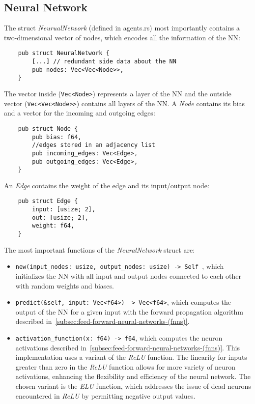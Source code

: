 \subsection{Neural Network}\label{subsec:neural-network}
The struct \textit{NeurualNetwork} (defined in agents.rs) most importantly contains a two-dimensional vector of nodes, which encodes all the information of the NN\@:
\begin{verbatim}
    pub struct NeuralNetwork {
        [...] // redundant side data about the NN
        pub nodes: Vec<Vec<Node>>,
    }
\end{verbatim}
The vector inside (\texttt{Vec<Node>}) represents a layer of the NN and the outside vector (\texttt{Vec<Vec<Node>>}) contains all layers of the NN\@.
A \textit{Node} contains its bias and a vector for the incoming and outgoing edges:
\begin{verbatim}
    pub struct Node {
        pub bias: f64,
        //edges stored in an adjacency list
        pub incoming_edges: Vec<Edge>,
        pub outgoing_edges: Vec<Edge>,
    }
\end{verbatim}
An \textit{Edge} contains the weight of the edge and its input/output node:
\begin{verbatim}
    pub struct Edge {
        input: [usize; 2],
        out: [usize; 2],
        weight: f64,
    }
\end{verbatim}
The most important functions of the \textit{NeuralNetwork} struct are:
\begin{itemize}
    \item \texttt{new(input_nodes: usize, output_nodes: usize) -> Self {}}, which initializes the NN with all input and output nodes connected to each other with random weights and biases.
    \item \texttt{predict(&self, input: Vec<f64>) -> Vec<f64>}, which computes the output of the NN for a given input with the forward propagation algorithm described in~\ref{subsec:feed-forward-neural-networks-(fnns)}.
    \item \texttt{activation_function(x: f64) -> f64}, which computes the neuron activations described in~\ref{subsec:feed-forward-neural-networks-(fnns)}.
    This implementation uses a variant of the \textit{ReLU} function.
    The linearity for inputs greater than zero in the \textit{ReLU} function allows for more variety of neuron activations, enhancing the flexibility and efficiency of the neural network.
    The chosen variant is the \textit{ELU} function, which addresses the issue of dead neurons encountered in \textit{ReLU} by permitting negative output values.
\end{itemize}

